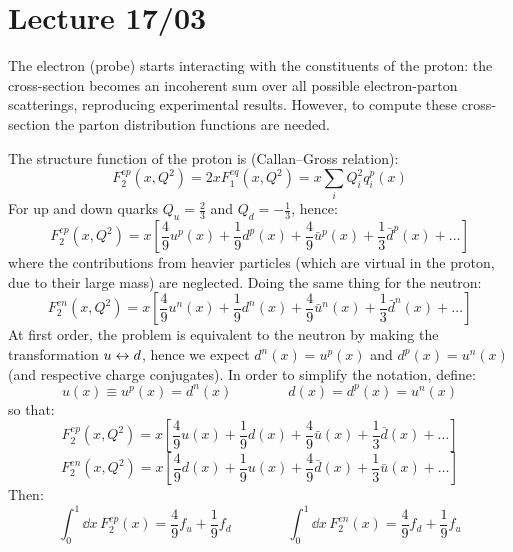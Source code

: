\chapter{Lecture 17/03}

The electron (probe) starts interacting with the constituents of the proton: the cross-section becomes an incoherent sum over all possible electron-parton scatterings, reproducing experimental results. However, to compute these cross-section the parton distribution functions are needed.

The structure function of the proton is (Callan--Gross relation):
\begin{equation*}
  F_2^{ep}(x,Q^2) = 2x F_1^{eq}(x,Q^2) = x \sum_i Q_i^2 q_i^p(x)
\end{equation*}
For up and down quarks $ Q_u = \frac{2}{3} $ and $ Q_d = - \frac{1}{3} $, hence:
\begin{equation*}
  F_2^{ep}(x,Q^2) = x \left[ \frac{4}{9} u^p(x) + \frac{1}{9} d^p(x) + \frac{4}{9} \bar{u}^p(x) + \frac{1}{3} \bar{d}^p(x) + \dots \right]
\end{equation*}
where the contributions from heavier particles (which are virtual in the proton, due to their large mass) are neglected. Doing the same thing for the neutron:
\begin{equation*}
  F_2^{en}(x,Q^2) = x \left[ \frac{4}{9} u^n(x) + \frac{1}{9} d^n(x) + \frac{4}{9} \bar{u}^n(x) + \frac{1}{3} \bar{d}^n(x) + \dots \right]
\end{equation*}
At first order, the problem is equivalent to the neutron by making the transformation $ u \leftrightarrow d $, hence we expect $ d^n(x) = u^p(x) $ and $ d^p(x) = u^n(x) $ (and respective charge conjugates). In order to simplify the notation, define:
\begin{equation*}
  u(x) \equiv u^p(x) = d^n(x)
  \qquad \qquad
  d(x) = d^p(x) = u^n(x)
\end{equation*}
so that:
\begin{equation}
  F_2^{ep}(x,Q^2) = x \left[ \frac{4}{9} u(x) + \frac{1}{9} d(x) + \frac{4}{9} \bar{u}(x) + \frac{1}{3} \bar{d}(x) + \dots \right]
\end{equation}
\begin{equation}
  F_2^{en}(x,Q^2) = x \left[ \frac{4}{9} d(x) + \frac{1}{9} u(x) + \frac{4}{9} \bar{d}(x) + \frac{1}{3} \bar{u}(x) + \dots \right]
\end{equation}
Then:
\begin{equation*}
  \int_0^1 \dd x \, F_2^{ep}(x) = \frac{4}{9} f_u + \frac{1}{9} f_d
  \qquad \qquad
  \int_0^1 \dd x \, F_2^{en}(x) = \frac{4}{9} f_d + \frac{1}{9} f_u
\end{equation*}
